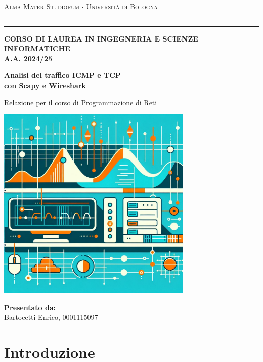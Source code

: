 \documentclass[12pt,a4paper]{report}
\begin{document}
\begin{titlepage}
\begin{center}
{{\Large{\textsc{Alma Mater Studiorum $\cdot$ Università di Bologna}}}} \rule[0.1cm]{15.8cm}{0.1mm}
\rule[0.5cm]{15.8cm}{0.6mm}
{\small{\bf CORSO DI LAUREA IN INGEGNERIA E SCIENZE INFORMATICHE \\ A.A. 2024/25 }}
\end{center}
\vspace{15mm}
\begin{center}
{\LARGE{\bf Analisi del traffico ICMP e TCP}}\\
\vspace{2mm}
{\LARGE{\bf con Scapy e Wireshark}}
\end{center}
\begin{center}
{\LARGE Relazione per il corso di Programmazione di Reti}
\end{center}

\vspace{8mm}
\begin{center}
\includegraphics[width=0.7\textwidth]{Copertina}
\end{center}
\vspace{15mm}

{\large{\bf \noindent
Presentato da:\\}
Bartocetti Enrico, 0001115097}
\end{titlepage}

\tableofcontents

\chapter{Introduzione}
\end{document}
